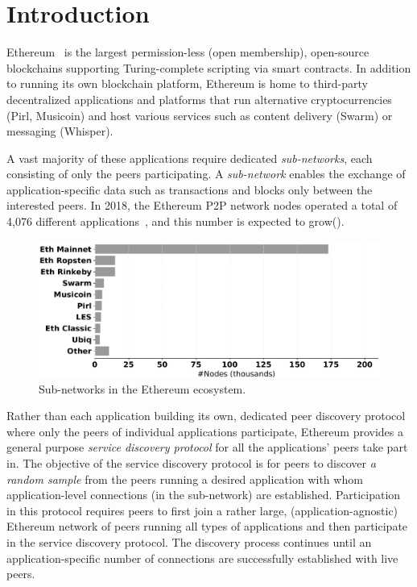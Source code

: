 
\section{Introduction}

Ethereum~\cite{buterin2013ethereum}  is the largest permission-less (\ie open membership), open-source blockchains supporting Turing-complete scripting via smart contracts. 
In addition to running its own blockchain platform, Ethereum is home to third-party decentralized applications and platforms that run alternative cryptocurrencies (Pirl, Musicoin) and host various services such as content delivery (Swarm) or messaging (Whisper).

A vast majority of these applications require dedicated \emph{sub-networks}, each consisting of only the peers participating. A \emph{sub-network} enables the exchange of application-specific data such as transactions and blocks only between the interested peers. In 2018, the Ethereum P2P network nodes operated a total of 4,076 different applications~\cite{kim2018measuring}, and this number is expected to grow().

\begin{figure}
    \includegraphics[width=1\linewidth]{img/ecosystem}
    \caption{Sub-networks in the Ethereum ecosystem.}
    \label{fig:ecosystem}
\end{figure}

Rather than each application building its own, dedicated peer discovery protocol where only the peers of individual applications participate, Ethereum provides a general purpose \textit{service discovery protocol} for all the applications' peers take part in. The objective of the service discovery protocol is for peers to discover \textit{a random sample} from the peers running a desired application with whom application-level connections (\ie in the sub-network) are established. Participation in this protocol requires peers to first join a rather large, (application-agnostic) Ethereum network of peers running all types of applications and then participate in the service discovery protocol. The discovery process continues until an application-specific number of connections are successfully established with live peers. 


